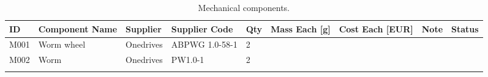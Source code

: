 

\begin{longtable}{|m{}|m{}|m{}|m{}|m{}|m{}|m{}|m{}|m{}|}

\hline
\textbf{ID} & \textbf{Component Name} & \textbf{Supplier} & \textbf{Supplier Code} & \textbf{Qty} & \textbf{Mass Each [g]} & \textbf{Cost Each [EUR]} & \textbf{Note} & \textbf{Status} \\ \hline
M001 & Worm wheel     & Onedrives & ABPWG 1.0-58-1  & 2   &                   &                     &      &        \\ \hline
M002 & Worm           & Onedrives & PW1.0-1        & 2   &                   &                     &      &        \\ \hline




\caption{Mechanical components.}
\label{tab:component-mech}
\end{longtable}
\raggedbottom